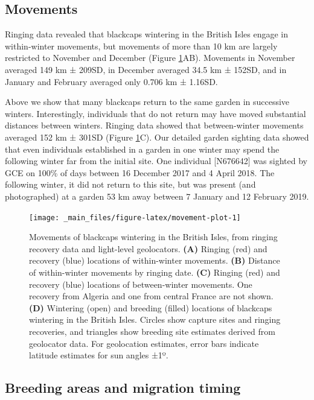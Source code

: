 \documentclass[a4paper, twoside]{templates/ociamthesis}
\begin{document}
\hypertarget{movements-1}{%
\subsection{Movements}\label{movements-1}}

Ringing data revealed that blackcaps wintering in the British Isles engage in within-winter movements, but movements of more than 10 km are largely restricted to November and December (Figure \ref{fig:movement-plot}AB). Movements in November averaged 149 km ± 209SD, in December averaged 34.5 km ± 152SD, and in January and February averaged only 0.706 km ± 1.16SD.

Above we show that many blackcaps return to the same garden in successive winters. Interestingly, individuals that do not return may have moved substantial distances between winters. Ringing data showed that between-winter movements averaged 152 km ± 301SD (Figure \ref{fig:movement-plot}C). Our detailed garden sighting data showed that even individuals established in a garden in one winter may spend the following winter far from the initial site. One individual {[}N676642{]} was sighted by GCE on 100\% of days between 16 December 2017 and 4 April 2018. The following winter, it did not return to this site, but was present (and photographed) at a garden 53 km away between 7 January and 12 February 2019.



\begin{figure}
\texttt{[image: \_main\_files/figure-latex/movement-plot-1]} \caption{Movements of blackcaps wintering in the British Isles, from ringing recovery data and light-level geolocators. \textbf{(A)} Ringing (red) and recovery (blue) locations of within-winter movements. \textbf{(B)} Distance of within-winter movements by ringing date. \textbf{(C)} Ringing (red) and recovery (blue) locations of between-winter movements. One recovery from Algeria and one from central France are not shown. \textbf{(D)} Wintering (open) and breeding (filled) locations of blackcaps wintering in the British Isles. Circles show capture sites and ringing recoveries, and triangles show breeding site estimates derived from geolocator data. For geolocation estimates, error bars indicate latitude estimates for sun angles ±1º.}\label{fig:movement-plot}
\end{figure}

\hypertarget{breeding-areas-and-migration-timing}{%
\subsection{Breeding areas and migration timing}\label{breeding-areas-and-migration-timing}}
\end{document}
